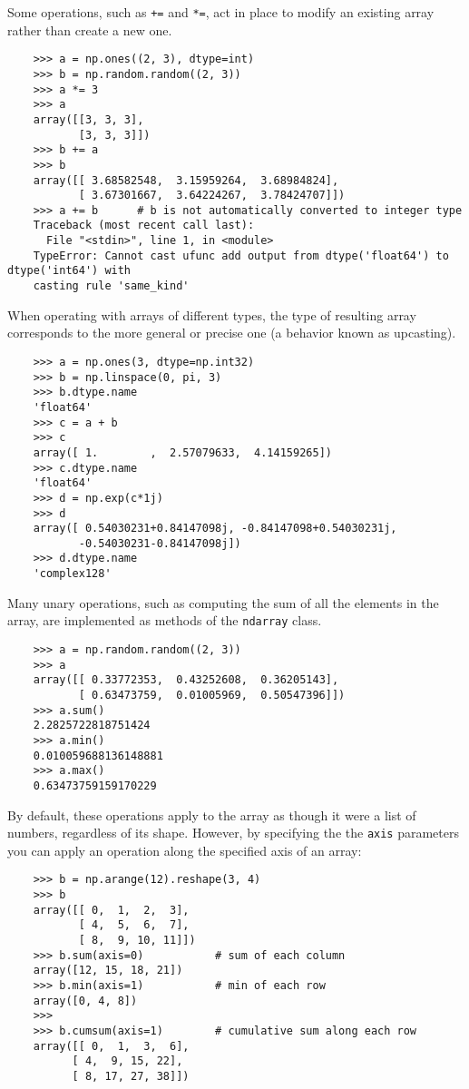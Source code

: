 \documentclass[UTF8]{article}
\begin{document}
Some operations, such as \texttt{+=} and \texttt{*=}, act in place to modify an existing array
rather than create a new one.
\begin{verbatim}
    >>> a = np.ones((2, 3), dtype=int)
    >>> b = np.random.random((2, 3))
    >>> a *= 3
    >>> a
    array([[3, 3, 3],
           [3, 3, 3]])
    >>> b += a
    >>> b
    array([[ 3.68582548,  3.15959264,  3.68984824],
           [ 3.67301667,  3.64224267,  3.78424707]])
    >>> a += b      # b is not automatically converted to integer type
    Traceback (most recent call last):
      File "<stdin>", line 1, in <module>
    TypeError: Cannot cast ufunc add output from dtype('float64') to dtype('int64') with
    casting rule 'same_kind'
\end{verbatim}

When operating with arrays of different types, the type of resulting array corresponds to the more
general or precise one (a behavior known as upcasting).
\begin{verbatim}
    >>> a = np.ones(3, dtype=np.int32)
    >>> b = np.linspace(0, pi, 3)
    >>> b.dtype.name
    'float64'
    >>> c = a + b
    >>> c
    array([ 1.        ,  2.57079633,  4.14159265])
    >>> c.dtype.name
    'float64'
    >>> d = np.exp(c*1j)
    >>> d
    array([ 0.54030231+0.84147098j, -0.84147098+0.54030231j,
           -0.54030231-0.84147098j])
    >>> d.dtype.name
    'complex128'
\end{verbatim}

Many unary operations, such as computing the sum of all the elements in the array, are implemented
as methods of the \texttt{ndarray} class.
\begin{verbatim}
    >>> a = np.random.random((2, 3))
    >>> a
    array([[ 0.33772353,  0.43252608,  0.36205143],
           [ 0.63473759,  0.01005969,  0.50547396]])
    >>> a.sum()
    2.2825722818751424
    >>> a.min()
    0.010059688136148881
    >>> a.max()
    0.63473759159170229
\end{verbatim}

By default, these operations apply to the array as though it were a list of numbers, regardless of
its shape. However, by specifying the the \texttt{axis} parameters you can apply an operation along
the specified axis of an array:
\begin{verbatim}
    >>> b = np.arange(12).reshape(3, 4)
    >>> b
    array([[ 0,  1,  2,  3],
           [ 4,  5,  6,  7],
           [ 8,  9, 10, 11]])
    >>> b.sum(axis=0)           # sum of each column
    array([12, 15, 18, 21])
    >>> b.min(axis=1)           # min of each row
    array([0, 4, 8])
    >>>
    >>> b.cumsum(axis=1)        # cumulative sum along each row
    array([[ 0,  1,  3,  6],
          [ 4,  9, 15, 22],
          [ 8, 17, 27, 38]])
\end{verbatim}
\end{document}
